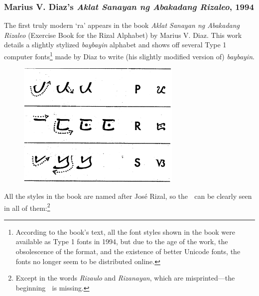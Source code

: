 \documentclass[a4paper,pagesize,openany,14pt,parskip=never]{scrbook}
\newcommand{\≈}{$\approx$}
\begin{document}
\subsubsection{Marius V. Diaz's {\em Aklat Sanayan ng Abakadang Rizaleo}, 1994}
The first truly modern `ra' appears in the book {\em Aklat Sanayan ng Abakadang Rizaleo} (Exercise Book for the Rizal Alphabet) by Marius V. Diaz. This work details a slightly stylized {\em baybayin} alphabet and shows off several Type 1 computer fonts\footnote{According to the book's text, all the font styles shown in the book were available as Type 1 fonts in 1994, but due to the age of the work, the obsolescence of the format, and the existence of better Unicode fonts, the fonts no longer seem to be distributed online.} made by Diaz to write (his slightly modified version of) {\em baybayin}.

\begin{figure}[h]
\includegraphics[width=0.7\textwidth]{AR_PRS}
\end{figure}

\newpage
All the styles in the book are named after Jos\'e Rizal, so the {\baybayin ᜍ} can be clearly seen in all of them:\footnote{Except in the words {\em Rizaulo} and {\em Rizanayan}, which are misprinted---the beginning {\baybayin ᜍᜒ} is missing.}
\end{document}
